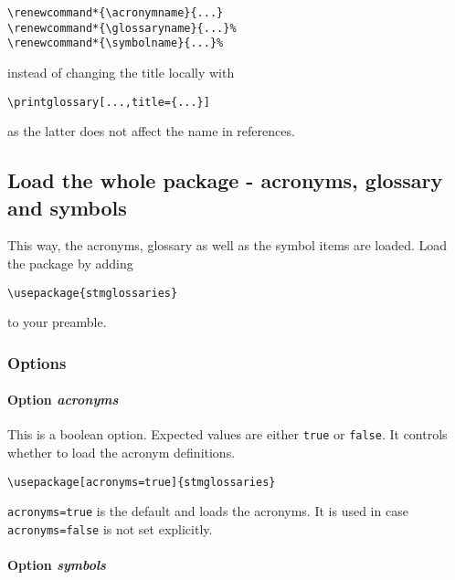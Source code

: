 \documentclass[%
  type=article,%
  layout=koma,%
  hyperref=true,%
  conditionallox=true,%
  conditionalloxnewpage=false,%
  date=true,%
  index=true,%
  listings=true%
]{stmtext}
\begin{document}
\begin{verbatim}
\renewcommand*{\acronymname}{...}
\renewcommand*{\glossaryname}{...}%
\renewcommand*{\symbolname}{...}%
\end{verbatim}

instead of changing the title locally with

\begin{verbatim}
\printglossary[...,title={...}]
\end{verbatim}

as the latter does not affect the name in references.

\subsection{Load the whole package - acronyms, glossary and symbols}
\label{sec:usage:preamble:wholepackage}

This way, the acronyms, glossary as well as the symbol items are loaded. Load the package by adding

\begin{verbatim}
\usepackage{stmglossaries}
\end{verbatim}

to your preamble.

\subsubsection{Options}
\label{sec:usage:preamble:wholepackage:options}

\paragraph{Option \protect\textit{acronyms}}
\label{sec:usage:preamble:wholepackage:options:acronyms}

This is a boolean option. Expected values are either \texttt{true} or \texttt{false}. It controls whether to load the acronym definitions.

\begin{verbatim}
\usepackage[acronyms=true]{stmglossaries}
\end{verbatim}

\texttt{acronyms=true} is the default and loads the acronyms. It is used in case \texttt{acronyms=false} is not set explicitly.

\paragraph{Option \protect\textit{symbols}}
\label{sec:usage:preamble:wholepackage:options:symbols}
\end{document}
